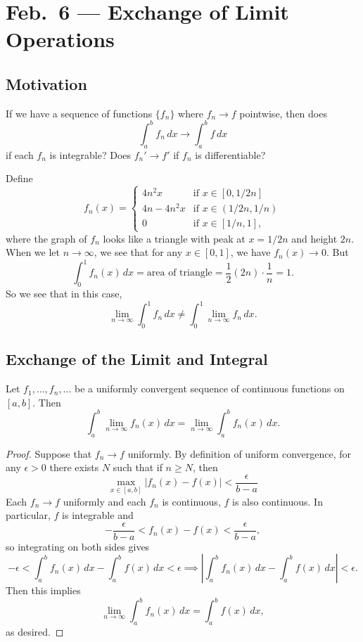 \chapter{Feb.~6 --- Exchange of Limit Operations}

\section{Motivation}
If we have a sequence of functions $\{f_n\}$ where
$f_n \to f$ pointwise, then does
\[
  \int_a^b f_n\, dx \to \int_a^b f\, dx
\]
if each $f_n$ is integrable? Does
$f_n' \to f'$ if $f_n$ is differentiable?

\begin{example}
  Define
  \[
    f_n(x) =
    \begin{cases}
      4n^2 x & \text{if } x \in [0, 1 / 2n] \\
      4n - 4n^2 x & \text{if } x \in (1 / 2n, 1 / n) \\
      0 & \text{if } x \in [1 / n, 1],
    \end{cases}
  \]
  where the graph of $f_n$ looks like a triangle with
  peak at $x = 1 / 2n$ and height $2n$.
  When we let $n \to \infty$, we see that for any
  $x \in [0, 1]$, we have $f_n(x) \to 0$. But
  \[
    \int_0^1 f_n(x)\, dx = \text{area of triangle}
    = \frac{1}{2} (2n) \cdot \frac{1}{n} = 1.
  \]
  So we see that in this case,
  \[
    \lim_{n \to \infty} \int_0^1 f_n \, dx \ne \int_0^1 \lim_{n \to \infty} f_n \, dx.
  \]
\end{example}

\section{Exchange of the Limit and Integral}

\begin{theorem}
  \label{thm:exchange-limit-integral}
  Let $f_1, \dots, f_n, \dots$ be a uniformly
  convergent sequence of continuous functions
  on $[a, b]$. Then
  \[
    \int_a^b \lim_{n \to \infty} f_n(x)\, dx
    = \lim_{n \to \infty} \int_a^b f_n(x)\, dx.
  \]
\end{theorem}

\begin{proof}
  Suppose that $f_n \to f$ uniformly.
  By definition of uniform convergence, for any
  $\epsilon > 0$ there exists $N$ such that if
  $n \ge N$, then
  \[
    \max_{x \in [a, b]}|f_n(x) - f(x)| < \frac{\epsilon}{b - a}
  \]
  Each $f_n \to f$ uniformly and each $f_n$ is continuous,
  $f$ is also continuous. In particular, $f$ is
  integrable and
  \[
    -\frac{\epsilon}{b - a} < f_n(x) - f(x) < \frac{\epsilon}{b - a},
  \]
  so integrating on both sides gives
  \[
    -\epsilon < \int_a^b f_n(x)\, dx - \int_a^b f(x)\, dx < \epsilon \implies
    \left| \int_a^b f_n(x)\, dx - \int_a^b f(x)\, dx \right| < \epsilon.
  \]
  Then this implies
  \[
    \lim_{n \to \infty} \int_a^b f_n(x)\, dx = \int_a^b f(x)\, dx,
  \]
  as desired.
\end{proof}


